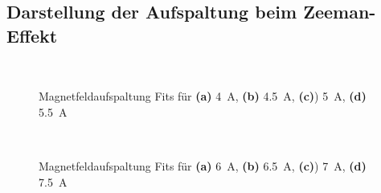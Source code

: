 \documentclass[11pt, a4paper]{article}
\begin{document}
\begin{appendix}
\section{Darstellung der Aufspaltung beim Zeeman-Effekt}

\begin{figure}
\begin{subfigure}[c]{0.5\textwidth}
\scalebox{0.75}{
	
	}
	\subcaption{}
\end{subfigure}
\begin{subfigure}[c]{0.5\textwidth}
\scalebox{0.75}{
	
	}
	\subcaption{}
\end{subfigure}
\\
\begin{subfigure}[c]{0.5\textwidth}
	\scalebox{0.75}{
	
	}
	\subcaption{}
\end{subfigure}
\begin{subfigure}[c]{0.5\textwidth}
\scalebox{0.75}{
	
	}
	\subcaption{}
\end{subfigure}
\caption{Magnetfeldaufspaltung Fits für \textbf{(a)} \SI{4}{\ampere}, \textbf{(b)} \SI{4.5}{\ampere}, \textbf{(c)}) \SI{5}{\ampere}, \textbf{(d)} \SI{5.5}{\ampere}}
\end{figure}

\begin{figure}
\begin{subfigure}[c]{0.5\textwidth}
\scalebox{0.75}{
	
	}
	\subcaption{}
\end{subfigure}
\begin{subfigure}[c]{0.5\textwidth}
\scalebox{0.75}{
	
	}
	\subcaption{}
\end{subfigure}
\\
\begin{subfigure}[c]{0.5\textwidth}
	\scalebox{0.75}{
	
	}
	\subcaption{}
\end{subfigure}
\begin{subfigure}[c]{0.5\textwidth}
\scalebox{0.75}{
	
	}
	\subcaption{}
\end{subfigure}
\caption{Magnetfeldaufspaltung Fits für \textbf{(a)} \SI{6}{\ampere}, \textbf{(b)} \SI{6.5}{\ampere}, \textbf{(c)}) \SI{7}{\ampere}, \textbf{(d)} \SI{7.5}{\ampere}}
\end{figure}


\end{appendix}
\end{document}
